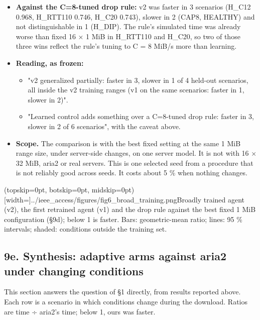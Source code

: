 \documentclass{ieeeaccess}
\begin{document}
\begin{itemize}
\begin{itemize}
\item v1 on the same four was faster in 1 and slower in 2. v2 was faster than v1 in all 6 live scenarios.
\item In H\_RTT110, v2 was 10 \% faster live than the simulator predicted (68.6 s against 76.4 s), while the fixed arms were 4 \% slower. That advantage is larger than the simulator supports, and is not explained here.
\end{itemize}
\item \textbf{Against the C=8-tuned drop rule:} v2 was faster in 3 scenarios (H\_C12 0.968, H\_RTT110 0.746, H\_C20 0.743), slower in 2 (CAP8, HEALTHY) and not distinguishable in 1 (H\_DIP). The rule's simulated time was already worse than fixed 16 × 1 MiB in H\_RTT110 and H\_C20, so two of those three wins reflect the rule's tuning to C = 8 MiB/s more than learning.
\item \textbf{Reading, as frozen:}
\begin{itemize}
\item "v2 generalized partially: faster in 3, slower in 1 of 4 held-out scenarios, all inside the v2 training ranges (v1 on the same scenarios: faster in 1, slower in 2)".
\item "Learned control adds something over a C=8-tuned drop rule: faster in 3, slower in 2 of 6 scenarios", with the caveat above.
\end{itemize}
\item \textbf{Scope.} The comparison is with the best fixed setting at the same 1 MiB range size, under server-side changes, on one server model. It is not with 16 × 32 MiB, aria2 or real servers. This is one selected seed from a procedure that is not reliably good across seeds. It costs about 5 \% when nothing changes.
\end{itemize}

\Figure[t!](topskip=0pt, botskip=0pt, midskip=0pt)[width=\columnwidth]{../ieee_access/figures/fig6_broad_training.png}{Broadly trained agent (v2), the first retrained agent (v1) and the drop rule against the best fixed 1 MiB configuration (§9d); below 1 is faster. Bars: geometric-mean ratio; lines: 95 \% intervals; shaded: conditions outside the training set.}

\subsection*{9e. Synthesis: adaptive arms against aria2 under changing conditions}

This section answers the question of §1 directly, from results reported above. Each row is a scenario in which conditions change during the download. Ratios are time ÷ aria2's time; below 1, ours was faster.
\end{document}
